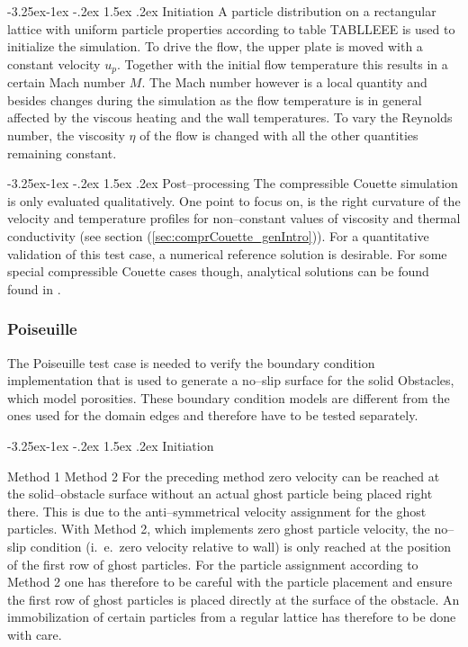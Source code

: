 \documentclass{report}
\makeatletter
\renewcommand\paragraph{\@startsection{paragraph}{4}{\z@}%
  {-3.25ex\@plus -1ex \@minus -.2ex}%
  {1.5ex \@plus .2ex}%
  {\normalfont\normalsize\bfseries}}
\makeatother
\begin{document}
\paragraph {Initiation}
A particle distribution on a rectangular lattice with uniform particle properties according to table TABLLEEE is used to initialize the simulation.
To drive the flow, the upper plate is moved with a constant velocity $u_p$. Together with the initial flow temperature this results in a certain Mach number $M$. The Mach number however is a local quantity and besides changes during the simulation as the flow temperature is in general affected by the viscous heating and the wall temperatures. %
To vary the Reynolds number, the viscosity $\eta$ of the flow is changed with all the other quantities remaining constant. 

\paragraph {Post--processing}
The compressible Couette simulation is only evaluated qualitatively. One point to focus on, is the right curvature of the velocity and temperature profiles for non--constant values of viscosity and thermal conductivity (see section (\ref{sec:comprCouette_genIntro})). For a quantitative validation of this test case, a numerical reference solution is desirable. For some special compressible Couette cases though, analytical solutions can be found found in \cite{Rogers1992}. 


\subsubsection{Poiseuille}
The Poiseuille test case is needed to verify the boundary condition implementation that is used to generate a no--slip surface for the solid Obstacles, which model porosities. These boundary condition models are different from the ones used for the domain edges and therefore have to be tested separately. 

\paragraph {Initiation}

Method 1
\linebreak
Method 2
For the preceding method zero velocity can be reached at the solid--obstacle surface without
an actual ghost particle being placed right there. This is due to the anti--symmetrical velocity assignment for the ghost particles. With Method 2, which implements zero ghost particle velocity, the no--slip condition (i.\ e.\ zero velocity relative to wall) is only reached at the position of the first row of ghost particles. For the particle assignment according to Method 2 one has therefore to be careful with the particle placement and ensure the first row of ghost particles is placed directly at the surface of the obstacle. An immobilization of certain particles from a regular lattice has therefore to be done with care.
\end{document}
